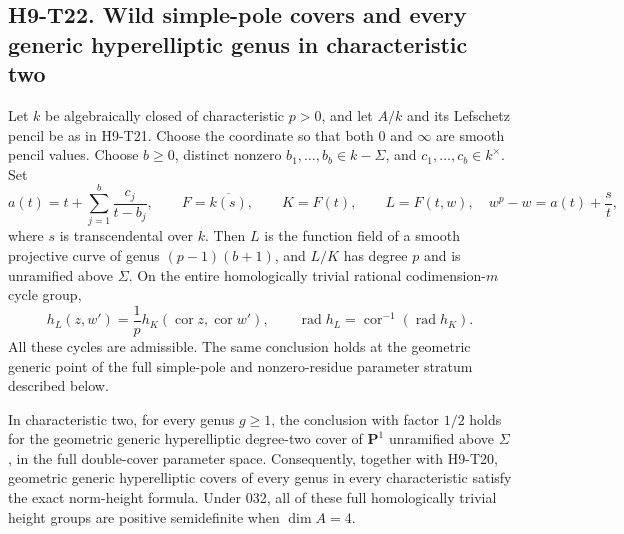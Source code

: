 
\subsection*{H9-T22. Wild simple-pole covers and every generic hyperelliptic genus in characteristic two}

\begin{theorem}[H9-T22]
Let $k$ be algebraically closed of characteristic $p>0$,
and let $A/k$ and its Lefschetz pencil be as in H9-T21.
Choose the coordinate so that both $0$ and $\infty$ are
smooth pencil values. Choose $b\ge0$, distinct nonzero
$b_1,\ldots,b_b\in k-\Sigma$, and $c_1,\ldots,c_b\in k^\times$.
Set
\[
 a(t)=t+\sum_{j=1}^{b}\frac{c_j}{t-b_j},\qquad
 F=\overline{k(s)},\qquad K=F(t),
 \qquad L=F(t,w),\quad w^p-w=a(t)+\frac{s}{t},
                                                               \tag{H9.117}
\]
where $s$ is transcendental over $k$. Then $L$ is the
function field of a smooth projective curve of genus
$(p-1)(b+1)$, and $L/K$ has degree $p$ and is unramified
above $\Sigma$. On the entire homologically trivial
rational codimension-$m$ cycle group,
\[
 h_L(z,w')=\frac1p h_K(\operatorname{cor}z,
                              \operatorname{cor}w'),\qquad
 \operatorname{rad}h_L
       =\operatorname{cor}^{-1}(\operatorname{rad}h_K).
                                                               \tag{H9.118}
\]
All these cycles are admissible. The same conclusion
holds at the geometric generic point of the full
simple-pole and nonzero-residue parameter stratum
described below.

In characteristic two, for every genus $g\ge1$, the
conclusion with factor $1/2$ holds for the geometric
generic hyperelliptic degree-two cover of $\mathbf P^1$
unramified above $\Sigma$, in the full double-cover
parameter space. Consequently, together with H9-T20,
geometric generic hyperelliptic covers of every genus
in every characteristic satisfy the exact norm-height
formula. Under 032, all of these full homologically
trivial height groups are positive semidefinite when
$\dim A=4$.
\end{theorem}

